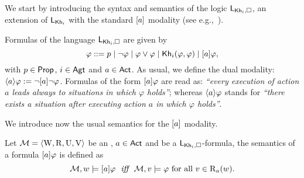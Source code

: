 We start by introducing the syntax and semantics of the logic $\mathsf{L}_{{\sf Kh}_i,\square}$,  an extension of $\mathsf{L}_{{\sf Kh}_i}$ with the standard $[a]$ modality (see e.g.,~\cite{HML,mlbook}).

\medskip

\begin{definition}\label{def:khimlsyntax}
Formulas of the language $\mathsf{L}_{{\sf Kh}_i,\square}$ are given by
\[
\varphi ::= p \mid \neg\varphi \mid \varphi\vee\varphi \mid {\sf Kh}_i(\varphi,\varphi) \mid [a]\varphi,
\]
with $p \in {\rm \sf Prop}$, $i \in {\rm \sf Agt}$ and $a \in {\rm \sf Act}$.
As usual, we define the dual modality: $\langle a \rangle\varphi := \neg[a]\neg\varphi$. Formulas of the form $[a]\varphi$ are read as: \emph{``every execution of action $a$ leads always to situations in which $\varphi$ holds''};
whereas  $\langle a \rangle\varphi$ stands for 
\emph{``there exists a situation after executing action $a$ in which $\varphi$ holds''}.
\end{definition}

\medskip

We introduce now the usual semantics for the $[a]$ modality.

\medskip

\begin{definition}\label{def:khimlsemantics}
Let $\mathcal{M} = \langle \operatorname{W}, \operatorname{R}, \operatorname{U}, \operatorname{V} \rangle$ be an \ults, $a \in {\rm \sf Act}$ and  be a $\mathsf{L}_{{\sf Kh}_i,\square}$-formula, the semantics of a formula $[a]\varphi$ is defined as
\[
\modults,w \models \mlbox{a}\varphi \ \ \iff \ \ \modults,v \models \varphi \mbox{ for all }v \in \R_a(w).
\]
\end{definition}

